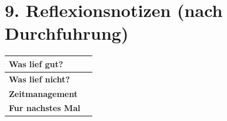 \documentclass[11pt, a4paper]{article}
\begin{document}

\section*{9. Reflexionsnotizen (nach Durchfuhrung)}

\begin{tabularx}{\textwidth}{|l|X|}
\hline
\textbf{Was lief gut?} & \\[2em]
\hline
\textbf{Was lief nicht?} & \\[2em]
\hline
\textbf{Zeitmanagement} & \\[2em]
\hline
\textbf{Fur nachstes Mal} & \\[2em]
\hline
\end{tabularx}
\end{document}
